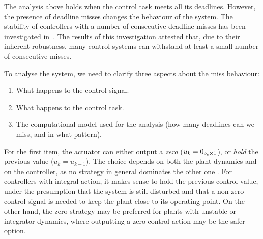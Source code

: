 The analysis above holds when the control task meets all its deadlines.
However, the presence of deadline misses changes the behaviour of the system.
The stability of controllers with a number of consecutive deadline misses has been investigated in~\cite{Maggio:2020}.
The results of this investigation attested that, due to their inherent robustness, many control systems can withstand at least a small number of consecutive misses.

To analyse the system, we need to clarify three aspects about the miss behaviour:

\begin{enumerate}[label=(\roman*)]
    \item What happens to the control signal.
    \item What happens to the control task.
    \item The computational model used for the analysis (how many deadlines can we miss, and in what pattern).
\end{enumerate}

For the first item, the actuator can either output a \emph{zero} ($u_k = 0_{o_c \times 1}$), or \emph{hold} the previous value ($u_k = u_{k-1}$).
The choice depends on both the plant dynamics and on the controller, as no strategy in general dominates the other one \cite{schenato09}.
For controllers with integral action, it makes sense to hold the previous control value, under the presumption that the system is still disturbed and that a non-zero control signal is needed to keep the plant close to its operating point.
On the other hand, the zero strategy may be preferred for plants with unstable or integrator dynamics, where outputting a zero control action may be the safer option.

